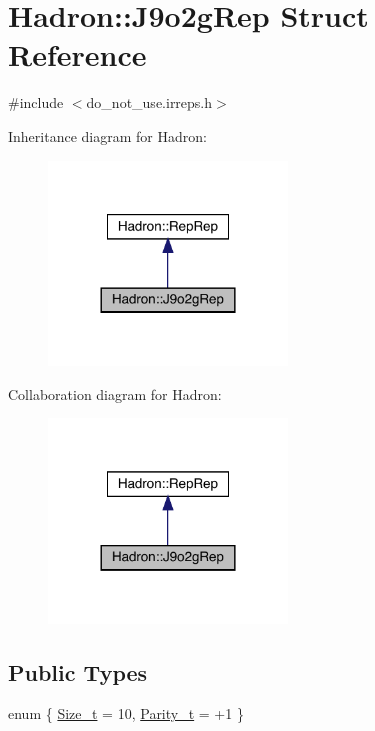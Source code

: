 \hypertarget{structHadron_1_1J9o2gRep}{}\section{Hadron\+:\+:J9o2g\+Rep Struct Reference}
\label{structHadron_1_1J9o2gRep}


{\ttfamily \#include $<$do\+\_\+not\+\_\+use.\+irreps.\+h$>$}



Inheritance diagram for Hadron\+:\nopagebreak
\begin{figure}[H]
\begin{center}
\leavevmode
\includegraphics[width=180pt]{d1/d75/structHadron_1_1J9o2gRep__inherit__graph}
\end{center}
\end{figure}


Collaboration diagram for Hadron\+:\nopagebreak
\begin{figure}[H]
\begin{center}
\leavevmode
\includegraphics[width=180pt]{d1/dd3/structHadron_1_1J9o2gRep__coll__graph}
\end{center}
\end{figure}
\subsection*{Public Types}
\begin{DoxyCompactItemize}
\item 
enum \{ \mbox{\hyperlink{structHadron_1_1J9o2gRep_a25fb98f8dc8dd2ebf183b77bcd174d3aaff2855ffdd7cd2007212d04d1377cdbf}{Size\+\_\+t}} = 10, 
\mbox{\hyperlink{structHadron_1_1J9o2gRep_a25fb98f8dc8dd2ebf183b77bcd174d3aaa5d8f50ad08077fc2257965bd98cbad2}{Parity\+\_\+t}} = +1
 \}
\end{DoxyCompactItemize}
